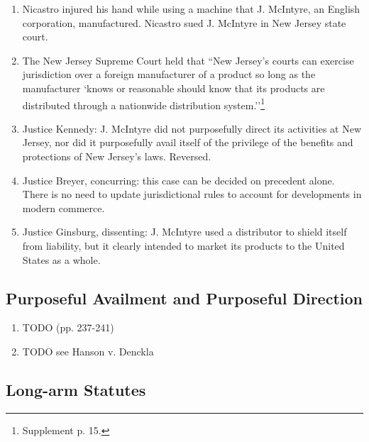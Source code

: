 \begin{enumerate}
    \item Nicastro injured his hand while using a machine that J. McIntyre, an 
    English corporation, manufactured. Nicastro sued J. McIntyre in New Jersey 
    state court. 
    \item The New Jersey Supreme Court held that ``New Jersey's courts can 
    exercise jurisdiction over a foreign manufacturer of a product so long as 
    the manufacturer `knows or reasonable should know that its products are 
    distributed through a nationwide distribution 
    system.''\footnote{Supplement p. 15.}
    \item Justice Kennedy: J. McIntyre did not purposefully direct its 
    activities at New Jersey, nor did it purposefully avail itself of the 
    privilege of the benefits and protections of New Jersey's laws. Reversed.
    \item Justice Breyer, concurring: this case can be decided on precedent 
    alone. There is no need to update jurisdictional rules to account for 
    developments in modern commerce.
    \item Justice Ginsburg, dissenting: J. McIntyre used a distributor to 
    shield itself from liability, but it clearly intended to market its 
    products to the United States as a whole.
\end{enumerate}

\subsection{Purposeful Availment and Purposeful Direction}

\begin{enumerate}
    \item TODO (pp. 237-241)
    \item TODO see Hanson v. Denckla
    \end{enumerate}

\subsection{Long-arm Statutes}

